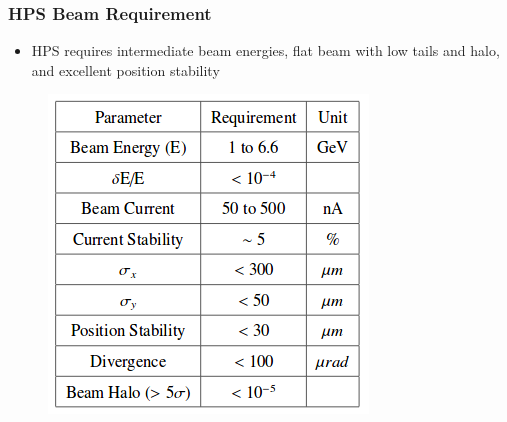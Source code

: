 \documentclass{beamer}
\begin{document}
\begin{frame}
\frametitle{HPS Beam Requirement}
\begin{itemize}
\item HPS requires intermediate beam energies, flat beam with low tails and halo, and excellent position stability
\end{itemize}
\begin{figure}
\includegraphics[width=0.50\linewidth]{figs/beam_parameters.png}
\end{figure}

\end{frame}

\end{document}
